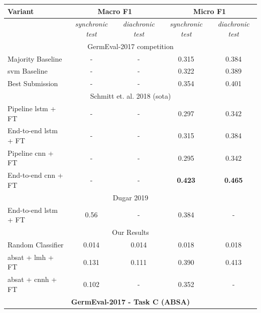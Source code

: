 \begin{table}[htp]
	\centering
	\begin{tabular*}{\textwidth}{l@{\extracolsep{\fill}}cccc@{}}
	\toprule
	Variant          & \multicolumn{2}{c}{\textbf{Macro F1}}     & \multicolumn{2}{c}{\textbf{Micro F1}}       \\ 
	\midrule
					 & \textit{synchronic test}      	& \textit{diachronic test} 		& \textit{synchronic test}      		& \textit{diachronic test} 		\\
	\midrule
								 \multicolumn{5}{c}{GermEval-2017 competition \cite{Wojatzki2017}} 					\\
	Majority Baseline        		 &  -        	&  -    	& 0.315        	&   0.384 							\\
	\gls{svm} Baseline        		 &  -        	&  -    	& 0.322        	&   0.389 							\\
	Best Submission 				 &  - 			&  - 		& 0.354 		& 0.401 							\\
	\midrule
								 \multicolumn{5}{c}{Schmitt et. al. 2018 {(\gls{sota})} \cite{Schmitt2018}} 		\\
	Pipeline \gls{lstm} + FT 		 & -        	& -    		& 0.297     	&   0.342							\\
	End-to-end \gls{lstm} + FT 		 & -        	& -    		& 0.315     	&   0.384 							\\
	Pipeline \gls{cnn} + FT 		 & -        	& -    		& 0.295     	&   0.342 							\\
	End-to-end \gls{cnn} + FT 		 & -        	& -    		& \textbf{0.423}&   \textbf{0.465} 					\\
	\midrule
	\multicolumn{5}{c}{Dugar 2019 \cite{Dugar2019}} 													\\
	End-to-end \gls{lstm} + FT 		 & 0.56        	& -    		&  0.384 &   - 					\\
	\midrule

								 \multicolumn{5}{c}{Our Results} 													\\

	Random Classifier          		 &  0.014   	& 0.014 	&  0.018  		&   0.018  							\\
	\gls{absat} + \gls{lmh} + FT     & 0.131        & 0.111		&  0.390    	&   0.413   							\\ 
	\gls{absat} + \gls{cnnh} + FT    & 0.102    	& -			&  0.352      	&   -   							\\ 
	\bottomrule
	\multicolumn{5}{c}{\textbf{GermEval-2017 - Task C {(ABSA)}}} \\


\end{tabular*}
\end{table}
